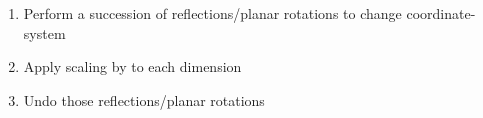 \begin{itemize}
\begin{itemize}
                \begin{enumerate}
                  \def\labelenumi{\arabic{enumi})}

                  \item
                        Perform a succession of reflections/planar rotations to change
                        coordinate-system
                  \item
                        Apply scaling by  to each dimension
                  \item
                        Undo those reflections/planar rotations
                \end{enumerate}
        \end{itemize}
\end{itemize}